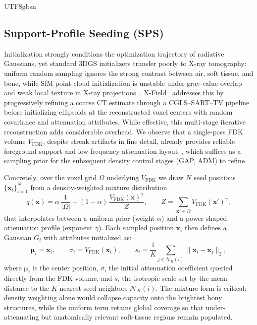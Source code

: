 \documentclass{egpubl}
\newcommand{\sps}{SPS}
\newcommand{\gap}{GAP}
\newcommand{\adm}{ADM}
\begin{document}
\begin{CJK*}{UTF8}{gbsn}
\subsection{Support-Profile Seeding (\sps)}
\label{sec:sps}

Initialization strongly conditions the optimization trajectory of radiative Gaussians, yet standard 3DGS initializers transfer poorly to X-ray tomography: uniform random sampling ignores the strong contrast between air, soft tissue, and bone, while SfM point-cloud initialization is unstable under gray-value overlap and weak local texture in X-ray projections~\cite{cai2024xgaussian}. X-Field~\cite{xfield2025} addresses this by progressively refining a coarse CT estimate through a CGLS--SART--TV pipeline before initializing ellipsoids at the reconstructed voxel centers with random covariance and attenuation attributes. While effective, this multi-stage iterative reconstruction adds considerable overhead. We observe that a single-pass FDK volume $V_{\text{FDK}}$, despite streak artifacts in fine detail, already provides reliable foreground support and low-frequency attenuation layout~\cite{wang2022rfinet,li2023gloredi,li2025threedgrct,hu2024r2}, which suffices as a sampling prior for the subsequent density control stages (\gap, \adm) to refine.

Concretely, over the voxel grid $\Omega$ underlying $V_{\text{FDK}}$ we draw $N$ seed positions $\{\mathbf{x}_i\}_{i=1}^{N}$ from a density-weighted mixture distribution
\begin{equation}
q(\mathbf{x})=\alpha\,\frac{1}{|\Omega|}+(1-\alpha)\,\frac{V_{\text{FDK}}(\mathbf{x})^{\gamma}}{Z},\qquad Z=\!\sum_{\mathbf{x}'\in\Omega}V_{\text{FDK}}(\mathbf{x}')^{\gamma},
\label{eq:sps}
\end{equation}
that interpolates between a uniform prior (weight $\alpha$) and a power-shaped attenuation profile (exponent $\gamma$). Each sampled position $\mathbf{x}_i$ then defines a Gaussian $G_i$ with attributes initialized as:
\begin{equation}
\boldsymbol{\mu}_i = \mathbf{x}_i,\qquad
\sigma_i = V_{\text{FDK}}(\mathbf{x}_i),\qquad
s_i = \frac{1}{K}\!\sum_{j\in\mathcal{N}_K(i)}\|\mathbf{x}_i-\mathbf{x}_j\|_2,
\label{eq:sps-attr}
\end{equation}
where $\boldsymbol{\mu}_i$ is the center position, $\sigma_i$ the initial attenuation coefficient queried directly from the FDK volume, and $s_i$ the isotropic scale set by the mean distance to the $K$-nearest seed neighbors $\mathcal{N}_K(i)$. The mixture form is critical: density weighting alone would collapse capacity onto the brightest bony structures, while the uniform term retains global coverage so that under-attenuating but anatomically relevant soft-tissue regions remain populated.


\end{CJK*}
\end{document}
